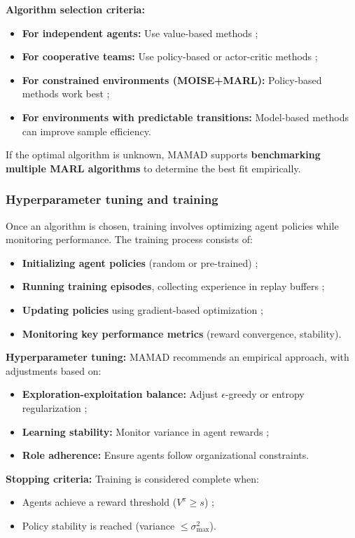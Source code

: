 \documentclass[pdflatex,sn-mathphys-num]{sn-jnl}%
\theoremstyle{thmstyleone}%
\theoremstyle{thmstyletwo}%
\theoremstyle{thmstylethree}%
\begin{document}
\noindent \textbf{Algorithm selection criteria:}
\begin{itemize}
    \item \textbf{For independent agents:} Use value-based methods ;
    \item \textbf{For cooperative teams:} Use policy-based or actor-critic methods ;
    \item \textbf{For constrained environments (MOISE+MARL):} Policy-based methods work best ;
    \item \textbf{For environments with predictable transitions:} Model-based methods can improve sample efficiency.
\end{itemize}

\noindent If the optimal algorithm is unknown, MAMAD supports \textbf{benchmarking multiple MARL algorithms} to determine the best fit empirically.

\subsubsection{Hyperparameter tuning and training}
Once an algorithm is chosen, training involves optimizing agent policies while monitoring performance. The training process consists of:
\begin{itemize}
    \item \textbf{Initializing agent policies} (random or pre-trained) ;
    \item \textbf{Running training episodes}, collecting experience in replay buffers ;
    \item \textbf{Updating policies} using gradient-based optimization ;
    \item \textbf{Monitoring key performance metrics} (reward convergence, stability).
\end{itemize}

\noindent \textbf{Hyperparameter tuning:}
MAMAD recommends an empirical approach, with adjustments based on:
\begin{itemize}
    \item \textbf{Exploration-exploitation balance:} Adjust $\epsilon$-greedy or entropy regularization ;
    \item \textbf{Learning stability:} Monitor variance in agent rewards ;
    \item \textbf{Role adherence:} Ensure agents follow organizational constraints.
\end{itemize}

\noindent \textbf{Stopping criteria:}
Training is considered complete when:
\begin{itemize}
    \item Agents achieve a reward threshold ($V^{\pi} \geq s$) ;
    \item Policy stability is reached (variance $\leq \sigma_{\max}^2$).
\end{itemize}
\end{document}

